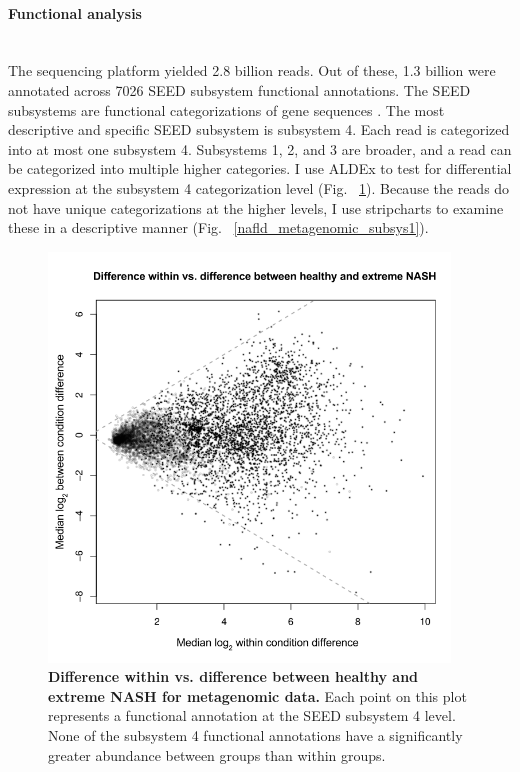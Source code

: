 \paragraph{Functional analysis}\mbox{}\\
The sequencing platform yielded 2.8 billion reads. Out of these, 1.3 billion were annotated across 7026 SEED subsystem functional annotations. The SEED subsystems are functional categorizations of gene sequences \cite{overbeek2005subsystems}. The most descriptive and specific SEED subsystem is subsystem 4. Each read is categorized into at most one subsystem 4. Subsystems 1, 2, and 3 are broader, and a read can be categorized into multiple higher categories. I use ALDEx to test for differential expression at the subsystem 4 categorization level (Fig. ~\ref{nafld_metagenomic_aldex}). Because the reads do not have unique categorizations at the higher levels, I use stripcharts to examine these in a descriptive manner (Fig. ~\ref{nafld_metagenomic_subsys1}).

\begin{figure}[h]
\begin{center}
\includegraphics[width=0.95\textwidth]{metagenomic_aldex.png}
\caption[Difference within vs. difference between healthy and extreme NASH for metagenomic data.]{\textbf{Difference within vs. difference between healthy and extreme NASH for metagenomic data.} Each point on this plot represents a functional annotation at the SEED subsystem 4 level. None of the subsystem 4 functional annotations have a significantly greater abundance between groups than within groups.}
\label{nafld_metagenomic_aldex}
\end{center}
\end{figure}

